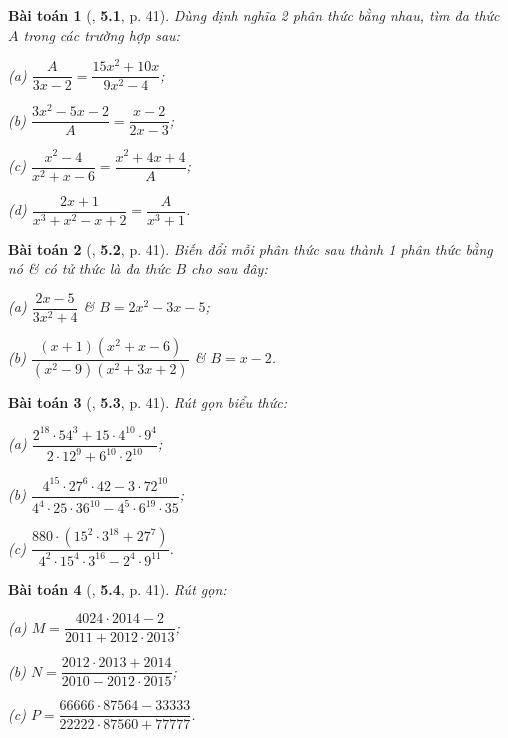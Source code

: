 \documentclass{article}
\numberwithin{equation}{section}
\newtheorem{baitoan}{Bài toán}
\begin{document}
\begin{baitoan}[\cite{Binh_Nam_Ngoc_Son_Toan_8_Dai_So}, \textbf{5.1}, p. 41]
	Dùng định nghĩa 2 phân thức bằng nhau, tìm đa thức $A$ trong các trường hợp sau:
	\begin{enumerate*}
		\item[(a)] $\dfrac{A}{3x - 2} = \dfrac{15x^2 + 10x}{9x^2 - 4}$;
		\item[(b)] $\dfrac{3x^2 - 5x - 2}{A} = \dfrac{x - 2}{2x - 3}$;
		\item[(c)] $\dfrac{x^2 - 4}{x^2 + x - 6} = \dfrac{x^2 + 4x + 4}{A}$;
		\item[(d)] $\dfrac{2x + 1}{x^3 + x^2 - x + 2} = \dfrac{A}{x^3 + 1}$.
	\end{enumerate*}
\end{baitoan}

\begin{baitoan}[\cite{Binh_Nam_Ngoc_Son_Toan_8_Dai_So}, \textbf{5.2}, p. 41]
	Biến đổi mỗi phân thức sau thành 1 phân thức bằng nó \& có tử thức là đa thức $B$ cho sau đây:
	\begin{enumerate*}
		\item[(a)] $\dfrac{2x - 5}{3x^2 + 4}$ \& $B = 2x^2 - 3x - 5$;
		\item[(b)] $\dfrac{(x + 1)(x^2 + x - 6)}{(x^2 - 9)(x^2 + 3x + 2)}$ \& $B = x - 2$.
	\end{enumerate*}
\end{baitoan}

\begin{baitoan}[\cite{Binh_Nam_Ngoc_Son_Toan_8_Dai_So}, \textbf{5.3}, p. 41]
	Rút gọn biểu thức:
	\begin{enumerate*}
		\item[(a)] $\dfrac{2^{18}\cdot 54^3 + 15\cdot 4^{10}\cdot 9^4}{2\cdot 12^9 + 6^{10}\cdot 2^{10}}$;
		\item[(b)] $\dfrac{4^{15}\cdot 27^6\cdot 42 - 3\cdot 72^{10}}{4^4\cdot 25\cdot 36^{10}  - 4^5\cdot 6^{19}\cdot 35}$;
		\item[(c)] $\dfrac{880\cdot(15^2\cdot 3^{18} + 27^7)}{4^2\cdot 15^4\cdot 3^{16} - 2^4\cdot 9^{11}}$.
	\end{enumerate*}
\end{baitoan}

\begin{baitoan}[\cite{Binh_Nam_Ngoc_Son_Toan_8_Dai_So}, \textbf{5.4}, p. 41]
	Rút gọn:
	\begin{enumerate*}
		\item[(a)] $M = \dfrac{4024\cdot 2014 - 2}{2011 + 2012\cdot 2013}$;
		\item[(b)] $N = \dfrac{2012\cdot 2013 + 2014}{2010 - 2012\cdot 2015}$;
		\item[(c)] $P = \dfrac{66666\cdot 87564 - 33333}{22222\cdot 87560 + 77777}$.
	\end{enumerate*}
\end{baitoan}
\end{document}
